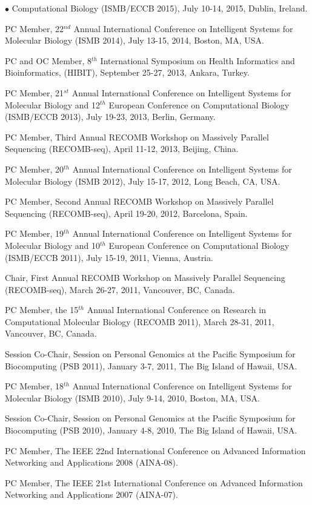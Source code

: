 \documentclass[margin,line]{res}
\newenvironment{list2}{
  \begin{list}{$\bullet$}{%
      \setlength{\itemsep}{0in}
      \setlength{\parsep}{0in} \setlength{\parskip}{0in}
      \setlength{\topsep}{0in} \setlength{\partopsep}{0in} 
      \setlength{\leftmargin}{0.2in}}}{\end{list}}
\begin{document}
\begin{resume}
\begin{list2}
  Computational Biology  (ISMB/ECCB 2015), 
  July 10-14, 2015, Dublin, Ireland.
\item
  PC Member, 22$^{nd}$ Annual International Conference on Intelligent Systems for Molecular Biology 
  (ISMB 2014), 
  July 13-15, 2014, Boston, MA, USA.
\item
  PC and OC Member, 8$^{th}$  International Symposium on Health Informatics and Bioinformatics, (HIBIT),
  September 25-27, 2013, Ankara, Turkey.
\item
  PC Member, 21$^{st}$ Annual International Conference on Intelligent Systems for Molecular Biology and 12$^{th}$ European Conference on 
  Computational Biology  (ISMB/ECCB 2013), 
  July 19-23, 2013, Berlin, Germany.
\item
  PC Member, Third Annual RECOMB Workshop on Massively Parallel Sequencing (RECOMB-seq), April 11-12, 2013, Beijing, China.
\item
  PC Member, 20$^{th}$ Annual International Conference on Intelligent Systems for Molecular Biology
  (ISMB 2012), July 15-17, 2012, Long Beach, CA, USA. 
\item
  PC Member, Second Annual RECOMB Workshop on Massively Parallel Sequencing (RECOMB-seq), April 19-20, 2012, Barcelona, Spain.
\item
  PC Member, 19$^{th}$ Annual International Conference on Intelligent Systems for Molecular Biology
  and 10$^{th}$ European Conference on Computational Biology 
  (ISMB/ECCB 2011), July 15-19, 2011, Vienna, Austria.
\item
  Chair, First Annual RECOMB Workshop on Massively Parallel Sequencing (RECOMB-seq), March 26-27, 2011, Vancouver, BC, Canada.
\item
  PC Member, the 15$^{th}$ Annual International Conference on Research in Computational Molecular Biology
  (RECOMB 2011), March 28-31, 2011, Vancouver, BC, Canada.
\item 
  Session Co-Chair, Session on Personal Genomics at the Pacific Symposium for Biocomputing (PSB 2011),
  January 3-7, 2011, The Big Island of Hawaii, USA.
\item
  PC Member, 18$^{th}$ Annual International Conference on Intelligent Systems for Molecular Biology
  (ISMB 2010), July 9-14, 2010, Boston, MA, USA.
\item 
  Session Co-Chair, Session on Personal Genomics at the Pacific Symposium for Biocomputing (PSB 2010),
  January 4-8, 2010, The Big Island of Hawaii, USA.
\item
  PC Member, The IEEE 22nd International Conference on
  Advanced Information Networking and Applications 2008 (AINA-08).
\item
  PC Member, The IEEE 21st International Conference on
  Advanced Information Networking and Applications 2007 (AINA-07).
\end{list2}


\end{resume}
\end{document}
